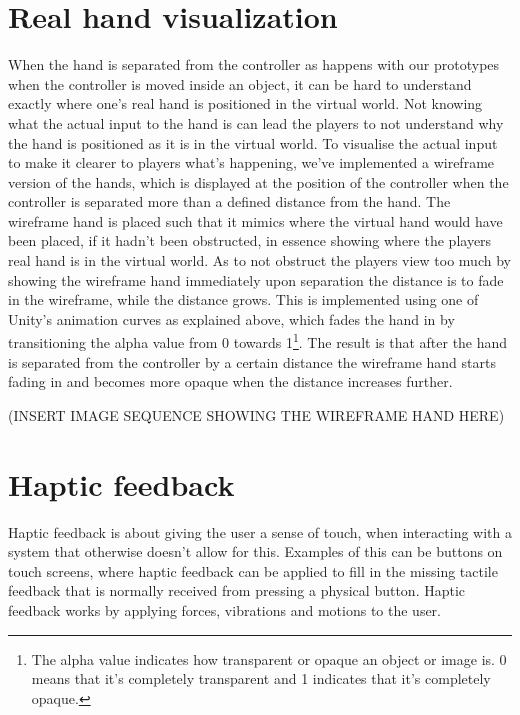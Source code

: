 \section{Real hand visualization}
\label{sec:handVisualization}
When the hand is separated from the controller as happens with our prototypes when the controller is moved inside an object, it can be hard to understand exactly where one's real hand is positioned in the virtual world. Not knowing what the actual input to the hand is can lead the players to not understand why the hand is positioned as it is in the virtual world. To visualise the actual input to make it clearer to players what's happening, we've implemented a wireframe version of the hands, which is displayed at the position of the controller when the controller is separated more than a defined distance from the hand. The wireframe hand is placed such that it mimics where the virtual hand would have been placed, if it hadn't been obstructed, in essence showing where the players real hand is in the virtual world. As to not obstruct the players view too much by showing the wireframe hand immediately upon separation the distance is to fade in the wireframe, while the distance grows. This is implemented using one of Unity's animation curves as explained above, which fades the hand in by transitioning the alpha value from 0 towards 1\footnote{The alpha value indicates how transparent or opaque an object or image is. 0 means that it's completely transparent and 1 indicates that it's completely opaque.}. The result is that after the hand is separated from the controller by a certain distance the wireframe hand starts fading in and becomes more opaque when the distance increases further.

(INSERT IMAGE SEQUENCE SHOWING THE WIREFRAME HAND HERE)

\section{Haptic feedback}
\label{sec:hapticFeedback}
Haptic feedback is about giving the user a sense of touch, when interacting with a system that otherwise doesn't allow for this. Examples of this can be buttons on touch screens, where haptic feedback can be applied to fill in the missing tactile feedback that is normally received from pressing a physical button. Haptic feedback works by applying forces, vibrations and motions to the user.

